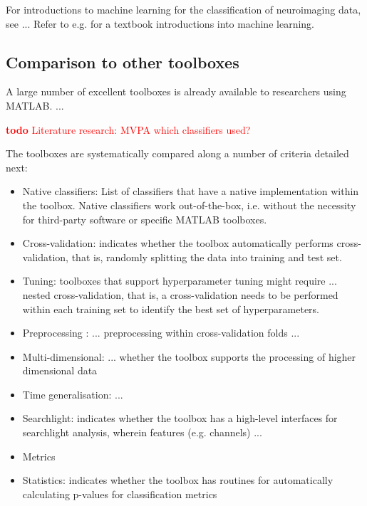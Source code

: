 \documentclass[utf8]{frontiersSCNS} %
\newcommand{\todo}[1]{\textcolor{red}{\textbf{todo} #1}}
\begin{document}
For introductions to machine learning for the classification of neuroimaging data, see \cite{Blankertz2011,Lemm2011,Mur2009,Grootswagers2017DecodingData,King2014} ... Refer to e.g. \cite{Hastie2009,Bishop2007} for a textbook introductions into machine learning.


\subsection{Comparison to other toolboxes}


A large number of excellent toolboxes is already available to researchers using MATLAB. 
...\checkmark



\todo{Literature research: MVPA which classifiers used?}

The toolboxes are systematically compared along a number of criteria detailed next:

\begin{itemize}
    \item Native classifiers: List of classifiers that have a native implementation within the toolbox. Native classifiers work out-of-the-box, i.e. without the necessity for third-party software or specific MATLAB toolboxes.
    \item Cross-validation: indicates whether the toolbox automatically performs cross-validation, that is, randomly splitting the data into training and test set.
    \item Tuning: toolboxes that support hyperparameter tuning might require ... nested cross-validation, that is, a cross-validation needs to be performed within each training set to identify the best set of hyperparameters.
    \item Preprocessing : ... preprocessing within cross-validation folds ...
    \item Multi-dimensional: ... whether the toolbox supports the processing of higher dimensional data
    \item Time generalisation: ...
    \cite{King2014}
    \item Searchlight: indicates whether the toolbox has a high-level interfaces for searchlight analysis, wherein features (e.g. channels) ...
    \item Metrics
    \item Statistics: indicates whether the toolbox has routines for automatically calculating p-values for classification metrics
\end{itemize}
\end{document}
